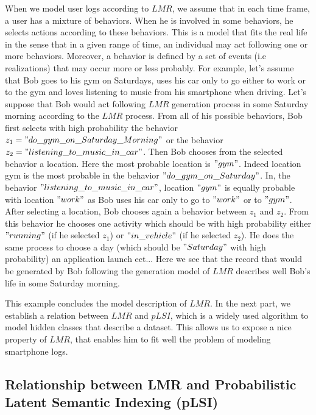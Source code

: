 When we model user logs according to $LMR$, we assume that in each time frame, a user has a mixture of behaviors. When he is involved in some behaviors, he selects actions according to these behaviors. This is a model that fits the real life in the sense that in a given range of time, an individual may act following one or more behaviors. Moreover, a behavior is defined by a set of events (i.e realizations) that may occur more or less probably. For example, let's assume that Bob goes to his gym on Saturdays, uses his car only to go either to work or to the gym and loves listening to music from his smartphone when driving. Let's suppose that Bob would act following $LMR$ generation process in some Saturday morning according to the $LMR$ process. From all of his possible behaviors, Bob first selects with high probability the behavior $z_{1}="do\_gym\_on\_Saturday\_Morning"$ or the behavior $z_{2}="listening\_to\_music\_in\_car"$. Then Bob chooses from the selected behavior a location. Here the most probable location is $"gym"$. Indeed location gym is the most probable in the behavior $"do\_gym\_on\_Saturday"$. In, the behavior $"listening\_to\_music\_ in\_car"$, location $"gym"$ is equally probable with location $"work"$ as Bob uses his car only to go to $"work"$ or to $"gym"$. After selecting a location, Bob chooses again a behavior between $z_{1}$ and $z_{2}$. From this behavior he chooses one activity which should be with high probability either $"running"$ (if he selected $z_{1}$) or $"in\_vehicle"$ (if he selected $z_{2}$). He does the same process to choose a day (which should be $"Saturday"$ with high probability) an application launch ect... Here we see that the record that would be generated by Bob following the generation model of $LMR$ describes well Bob's life in some Saturday morning. \par

This example concludes the model description of $LMR$. In the next part, we establish a relation between $LMR$ and $pLSI$, which is a widely used algorithm to model hidden classes that describe a dataset. This allows us to expose a nice property of $LMR$, that enables him to fit well the problem of modeling smartphone logs.


\subsection{Relationship between LMR and Probabilistic Latent Semantic Indexing (pLSI)}

